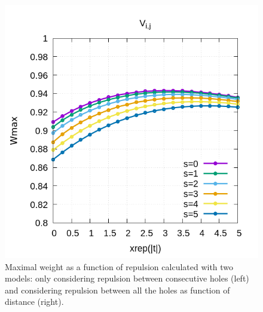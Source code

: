 \documentclass[12pt,twoside]{report}
\begin{document}
\begin{figure}[h!]
\begin{minipage}{0.4\textwidth}
			\includegraphics[scale=0.4]{Wmax_vs_xrep0vn.png}
		\end{minipage}
		\caption{\label{fig:} Maximal weight as a function of repulsion calculated with two models: only considering repulsion between consecutive holes (left) and considering repulsion between all the holes as function of distance (right). }
	\end{figure}
\end{document}
